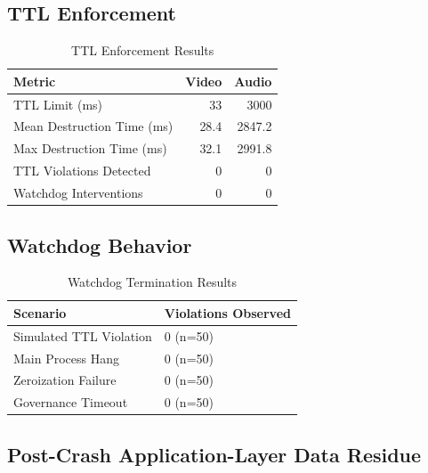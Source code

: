 \documentclass[conference]{IEEEtran}
\begin{document}
\subsection{TTL Enforcement}

\begin{table}[h]
\caption{TTL Enforcement Results}
\centering
\begin{tabular}{l r r}
\toprule
\textbf{Metric} & \textbf{Video} & \textbf{Audio} \\
\midrule
TTL Limit (ms) & 33 & 3000 \\
Mean Destruction Time (ms) & 28.4 & 2847.2 \\
Max Destruction Time (ms) & 32.1 & 2991.8 \\
TTL Violations Detected & 0 & 0 \\
Watchdog Interventions & 0 & 0 \\
\bottomrule
\end{tabular}
\label{tab:ttl}
\end{table}

\subsection{Watchdog Behavior}

\begin{table}[h]
\caption{Watchdog Termination Results}
\centering
\begin{tabular}{l l}
\toprule
\textbf{Scenario} & \textbf{Violations Observed} \\
\midrule
Simulated TTL Violation & 0 (n=50) \\
Main Process Hang & 0 (n=50) \\
Zeroization Failure & 0 (n=50) \\
Governance Timeout & 0 (n=50) \\
\bottomrule
\end{tabular}
\label{tab:watchdog}
\end{table}

\subsection{Post-Crash Application-Layer Data Residue}
\end{document}
